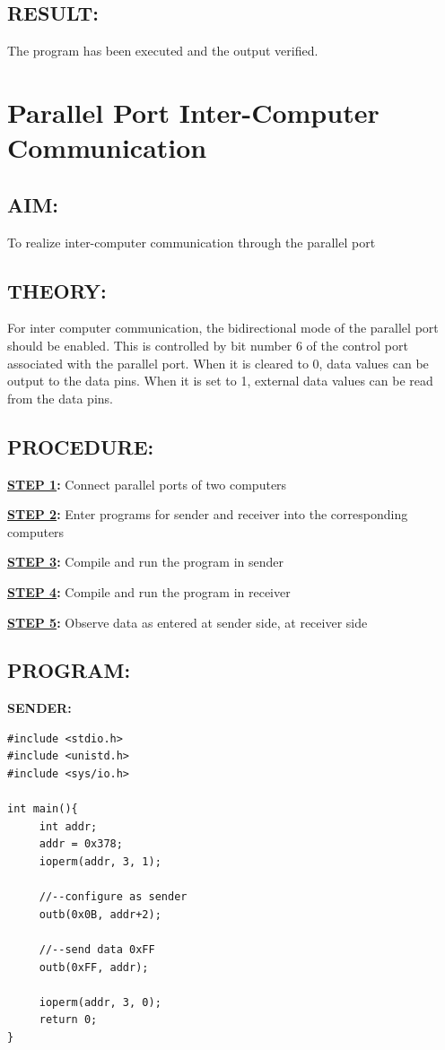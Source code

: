 \documentclass[a4paper,28pt,twoside,openright]{report}
\begin{document}
\section*{RESULT:}
The program has been executed and the output verified.
%
%
\chapter{Parallel Port Inter-Computer Communication}
%
%
%
%
\section*{AIM:}
To realize inter-computer communication through the parallel port
\section*{THEORY:}
For inter computer communication, the bidirectional mode of the parallel port should be enabled. This is controlled by bit number 6 of the control port associated with the parallel port. When it is cleared to 0, data values can be output to the data pins. When it is set to 1, external data values can be read from the data pins.
\section*{PROCEDURE:}
\textbf{\underline{STEP 1}:} Connect parallel ports of two computers

\textbf{\underline{STEP 2}:} Enter programs for sender and receiver into the corresponding\\\hspace*{55pt}computers

\textbf{\underline{STEP 3}:} Compile and run the program in sender

\textbf{\underline{STEP 4}:} Compile and run the program in receiver

\textbf{\underline{STEP 5}:} Observe data as entered at sender side, at receiver side

\newpage
\section*{PROGRAM:}
\textbf{SENDER:}
\begin{lstlisting}
#include <stdio.h>
#include <unistd.h>
#include <sys/io.h>

int main(){
     int addr;
     addr = 0x378;
     ioperm(addr, 3, 1);
     
     //--configure as sender
     outb(0x0B, addr+2);
     
     //--send data 0xFF
     outb(0xFF, addr);
     
     ioperm(addr, 3, 0);
     return 0;
}
\end{lstlisting}
\end{document}
